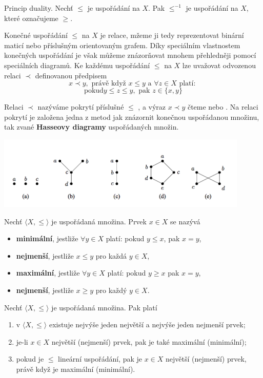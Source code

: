 \begin{sentence}
	Princip duality. Nechť $\leq$ je uspořádání na $X$. Pak $\leq^{-1}$ je uspořádání na $X$, které označujeme $\geq$.
\end{sentence}

Konečné uspořádání $\leq$ na $X$ je relace, mžeme ji tedy reprezentovat binární maticí nebo příslušným orientovaným grafem. Díky speciálním vlastnostem konečných uspořádání je však můžeme znázorňovat mnohem přehledněji pomocí speciálních diagramů. Ke každému uspořádání $\leq$ na $X$ lze uvažovat odvozenou relaci $\prec$ definovanou předpisem
$$x \prec y, \text{ právě když } x \leq y \text{ a } \forall z \in X \text{ platí: }$$
$$\text{pokud} y \leq z \leq y, \text{ pak } z \in \{ x, y\}$$



Relaci $\prec$ nazýváme pokrytí příslušné $\leq$ , a výraz $x \prec y$ čteme  nebo . Na relaci pokrytí je založena jedna z metod jak znázornit konečnou uspořádanou množinu, tak zvané \textbf{Hasseovy diagramy} uspořádaných množin.

\begin{center}
	\includegraphics[width=12cm]{img/HasseDiagrams}
\end{center}

\begin{definition}
	Nechť $\langle X, \leq \rangle$ je uspořádaná množina. Prvek $x \in X$ se nazývá
	\begin{itemize}
		\item \textbf{minimální}, jestliže $\forall y \in X$ platí: pokud $y \leq x$, pak $x = y$,
		\item \textbf{nejmenší}, jestliže $x \leq y$ pro každá $y \in X$,
		\item \textbf{maximální}, jestliže $\forall y \in X$ platí: pokud $y \geq x$ pak $x = y$,
		\item \textbf{nejmenší}, jestliže $x \geq y$ pro každý $y \in X$.
	\end{itemize}
\end{definition}

\begin{sentence}
	Nechť $\langle X, \leq \rangle$ je uspořádaná množina. Pak platí
	\begin{enumerate}
		\item v $\langle X, \leq \rangle$ existuje nejvýše jeden největší a nejvýše jeden nejmenší prvek;
		\item je-li $x \in X$ největší (nejmenší) prvek, pak je také maximální (minimální);
		\item pokud je $\leq$ lineární uspořádání, pak je $x \in X$ největší (nejmenší) prvek, právě když je maximální (minimální).
	\end{enumerate}
\end{sentence}

